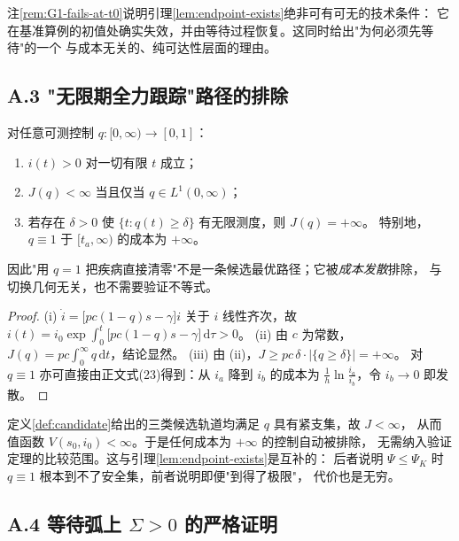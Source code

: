 注\ref{rem:G1-fails-at-t0}说明引理\ref{lem:endpoint-exists}绝非可有可无的技术条件：
它在基准算例的初值处确实失效，并由等待过程恢复。这同时给出"为何必须先等待"的一个
与成本无关的、纯可达性层面的理由。


\subsection*{A.3 "无限期全力跟踪"路径的排除}

\begin{lemma}
\label{lem:no-eradication}
对任意可测控制 $q:[0,\infty)\to[0,1]$：
\begin{enumerate}
\item[(i)] $i(t)>0$ 对一切有限 $t$ 成立；
\item[(ii)] $J(q)<\infty$ 当且仅当 $q\in L^1(0,\infty)$；
\item[(iii)] 若存在 $\delta>0$ 使 $\{t:q(t)\ge\delta\}$ 有无限测度，则 $J(q)=+\infty$。
      特别地，$q\equiv 1$ 于 $[t_a,\infty)$ 的成本为 $+\infty$。
\end{enumerate}
因此"用 $q=1$ 把疾病直接清零"不是一条候选最优路径；它被\emph{成本发散}排除，
与切换几何无关，也不需要验证不等式。
\end{lemma}

\begin{proof}
(i) $\dot i=\bigl[pc(1-q)s-\gamma\bigr]i$ 关于 $i$ 线性齐次，故
$i(t)=i_0\exp\int_0^t\bigl[pc(1-q)s-\gamma\bigr]\,\mathrm{d}\tau>0$。
(ii) 由 $c$ 为常数，$J(q)=pc\int_0^\infty q\,\mathrm{d}t$，结论显然。
(iii) 由 (ii)，$J\ge pc\,\delta\cdot\bigl|\{q\ge\delta\}\bigr|=+\infty$。
对 $q\equiv1$ 亦可直接由正文式(23)得到：从 $i_a$ 降到 $i_b$ 的成本为
$\frac{1}{h}\ln\frac{i_a}{i_b}$，令 $i_b\to0$ 即发散。
\end{proof}

\begin{remark}
定义\ref{def:candidate}给出的三类候选轨道均满足 $q$ 具有紧支集，故 $J<\infty$，
从而值函数 $V(s_0,i_0)<\infty$。于是任何成本为 $+\infty$ 的控制自动被排除，
无需纳入验证定理的比较范围。这与引理\ref{lem:endpoint-exists}是互补的：
后者说明 $\Psi\le\Psi_K$ 时 $q\equiv1$ 根本到不了安全集，前者说明即便"到得了极限"，
代价也是无穷。
\end{remark}


\subsection*{A.4 等待弧上 $\Sigma>0$ 的严格证明}

